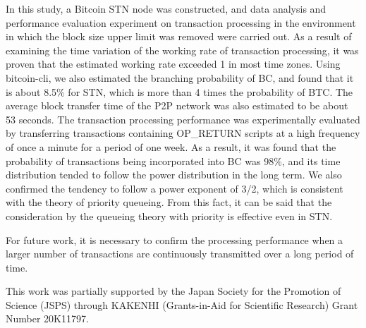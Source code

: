 \documentclass[graybox]{svmult}
\begin{document}
In this study, a Bitcoin STN node was constructed, and data analysis and performance evaluation experiment on transaction processing in the environment in which the block size upper limit was removed were carried out.
As a result of examining the time variation of the working rate of transaction processing, it was proven that the estimated working rate exceeded 1 in most time zones.
Using bitcoin-cli, we also estimated the branching probability of BC, and found that it is about 8.5\% for STN, which is more than 4 times the probability of BTC.
The average block transfer time of the P2P network was also estimated to be about 53 seconds.
The transaction processing performance was experimentally evaluated by transferring transactions containing OP\_RETURN scripts at a high frequency of once a minute for a period of one week.
As a result, it was found that the probability of transactions being incorporated into BC was 98\%, and its time distribution tended to follow the power distribution in the long term.
We also confirmed the tendency to follow a power exponent of 3/2, which is consistent with the theory of priority queueing.
From this fact, it can be said that the consideration by the queueing theory with priority is effective even in STN.


For future work, it is necessary to confirm the processing performance when a larger number of transactions are continuously transmitted over a long period of time.




\begin{acknowledgement}
 This work was partially supported by the Japan Society for the Promotion of 
Science (JSPS) through KAKENHI (Grants-in-Aid for Scientific Research) Grant 
Number 20K11797. 
\end{acknowledgement}
\end{document}
